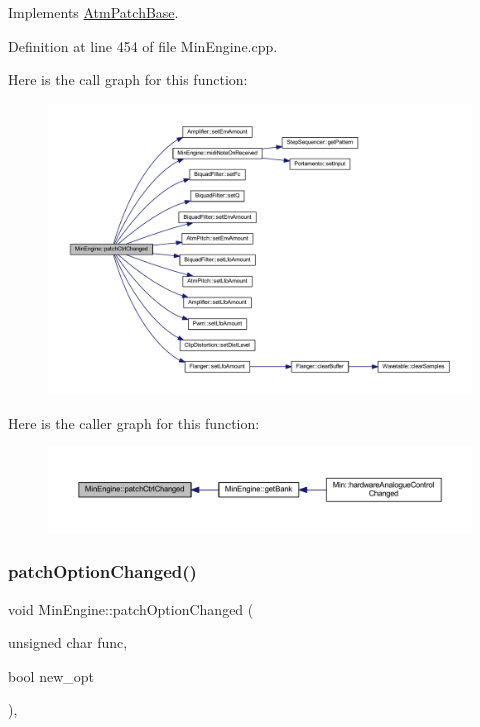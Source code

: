 Implements \hyperlink{class_atm_patch_base_a10abe1d35a241d61a83473ef8caaee33}{Atm\+Patch\+Base}.



Definition at line 454 of file Min\+Engine.\+cpp.

Here is the call graph for this function\+:
\nopagebreak
\begin{figure}[H]
\begin{center}
\leavevmode
\includegraphics[width=350pt]{d4/d0f/class_min_engine_ad26e5e985eb56946ae93dc3274874229_cgraph}
\end{center}
\end{figure}
Here is the caller graph for this function\+:
\nopagebreak
\begin{figure}[H]
\begin{center}
\leavevmode
\includegraphics[width=350pt]{d4/d0f/class_min_engine_ad26e5e985eb56946ae93dc3274874229_icgraph}
\end{center}
\end{figure}
\mbox{\label{class_min_engine_aff5a85aae7d6f6e5edd571c73c071871}} 
\subsubsection{\texorpdfstring{patch\+Option\+Changed()}{patchOptionChanged()}}
{\footnotesize\ttfamily void Min\+Engine\+::patch\+Option\+Changed (\begin{DoxyParamCaption}\item[{unsigned char}]{func,  }\item[{bool}]{new\+\_\+opt }\end{DoxyParamCaption})\hspace{0.3cm}{\ttfamily [inline]}, {\ttfamily [virtual]}}



